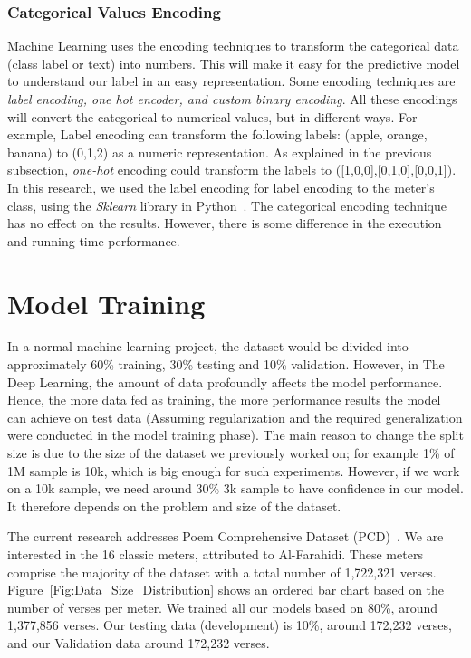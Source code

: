 \subsubsection{Categorical Values Encoding}\label{sec:label_encoder}

Machine Learning uses the encoding techniques to transform the categorical data (class label or text) into numbers. 
This will make it easy for the predictive model to understand our label in an easy representation. 
Some encoding techniques are \textit{label encoding, one hot encoder, and custom \textit{binary} encoding}. 
All these encodings will convert the categorical to numerical values, but in different ways. 
For example, Label encoding can transform the following labels: (apple, orange, banana) to (0,1,2) as a numeric representation. 
As explained in the previous subsection, \textit{one-hot} encoding could transform the labels to ([1,0,0],[0,1,0],[0,0,1]). 
In this research, we used the label encoding for label encoding to the meter’s class, using the \textit{Sklearn} library in Python~\cite{scikit-learn}. The categorical encoding technique has no effect on the results. However, there is some difference in the execution and running time performance.

\clearpage

\section{Model Training}
In a normal machine learning project, the dataset would be divided into approximately 60\% training, 30\% testing and 10\% validation. However, in The Deep Learning, the amount of data profoundly affects the model performance. 
Hence, the more data fed as training, the more performance results the model can achieve on test data (Assuming regularization and the required generalization were conducted in the model training phase). 
The main reason to change the split size is due to the size of the dataset we previously worked on; for example 1\% of 1M sample is 10k, which is big enough for such experiments. 
However, if we work on a 10k sample, we need around 30\% 3k sample to have confidence in our model. It therefore depends on the problem and size of the dataset.

The current research addresses Poem Comprehensive Dataset (PCD)~\cite{ArabicpoetryDS}. We are interested in the 16 classic meters, attributed to Al-Farahidi. These meters comprise the majority of the dataset with a total number of 1,722,321 verses. Figure~\ref{Fig:Data_Size_Distribution} shows an ordered bar chart based on the number of verses per meter. We trained all our models based on 80\%, around 1,377,856 verses. Our testing data (development) is 10\%, around 172,232 verses, and our Validation data around 172,232 verses.


